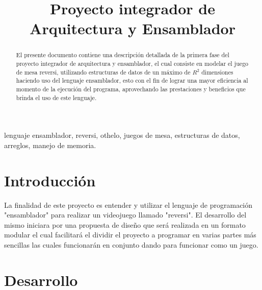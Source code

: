 \documentclass[conference]{IEEEtran}
\begin{document}
\title{Proyecto integrador de Arquitectura y Ensamblador}

\author{
\and
{}
}

\maketitle

\begin{abstract}
El presente documento contiene una descripción detallada de la primera fase del proyecto integrador de arquitectura y ensamblador,
el cual consiste en modelar el juego de mesa reversi, utilizando estructuras de datos de un máximo de $R^2$ dimensiones haciendo uso del lenguaje ensamblador,
esto con el fin de lograr una mayor eficiencia al momento de la ejecución del programa, aprovechando las prestaciones y beneficios que brinda el uso de este lenguaje.
\end{abstract}

\begin{IEEEkeywords}
lenguaje ensamblador, reversi, othelo, juegos de mesa, estructuras de datos, arreglos, manejo de memoria.
\end{IEEEkeywords}

\section{Introducción}

La finalidad de este proyecto es entender y utilizar el lenguaje de programación "ensamblador" para realizar un videojuego llamado "reversi".
El desarrollo del mismo iniciara por una propuesta de diseño que será realizada en un formato modular el cual facilitará el dividir el proyecto a programar en varias partes más sencillas las cuales funcionarán en conjunto dando para funcionar como un juego.

\section{Desarrollo}
\end{document}
